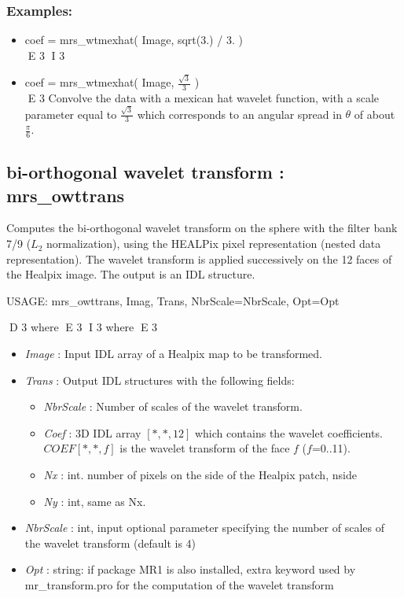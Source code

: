 \subsubsection*{Examples:} 
\begin{itemize}
D 3
\item coef = mrs\_wtmexhat( Image, sqrt(3.) / 3. ) \\
E 3
I 3
\item coef = mrs\_wtmexhat( Image, $\frac{\sqrt{3}}{3}$ ) \\
E 3
Convolve the data with a mexican hat wavelet function, with a scale parameter equal to $\frac{ \sqrt{3} }{3}$ 
which corresponds to an angular spread in $\theta$ of about $\frac{\pi}{6}$.
\end{itemize}



\subsection{bi-orthogonal wavelet transform : mrs\_owttrans}
Computes the bi-orthogonal wavelet transform on the sphere with the filter bank 7/9 ($L_2$ normalization), using 
the HEALPix pixel representation (nested data representation). The wavelet transform is applied successively on 
the 12 faces of the Healpix image. The output is an IDL structure.
{\bf
\begin{center}
     USAGE: mrs\_owttrans, Imag, Trans, NbrScale=NbrScale, Opt=Opt  
\end{center}}
D 3
where 
E 3
I 3
where
E 3
\begin{itemize}
\item {\em Image} : Input IDL array of a Healpix map to be transformed. 
\item {\em Trans} : Output IDL structures with the following fields:
\begin{itemize}  
\item {\em NbrScale} : Number of scales of the wavelet transform.
\item {\em Coef} : 3D IDL array $[*,*,12]$ which contains the wavelet coefficients. $COEF[*,*, f]$ is the wavelet transform of the face $f$ ($f$=0..11).
\item {\em Nx} : int. number of pixels on the side of the Healpix patch, nside
\item {\em Ny} : int, same as Nx.	 
\end{itemize}
\item {\em NbrScale} : int, input optional parameter specifying the number of scales of the wavelet transform (default is 4)
\item {\em Opt} : string: if package MR1 is also installed, extra keyword used by mr\_transform.pro for the computation of the wavelet transform
\end{itemize}

